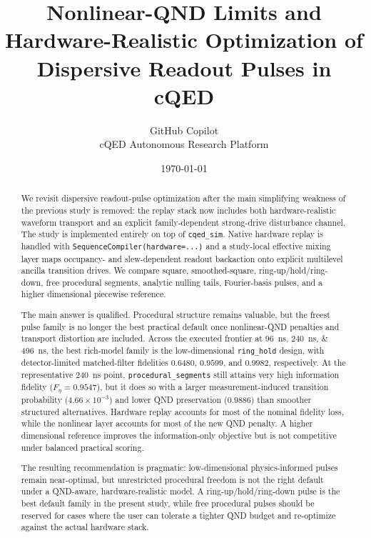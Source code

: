 \documentclass[11pt, a4paper]{article}
\title{\textbf{Nonlinear-QND Limits and Hardware-Realistic Optimization of Dispersive Readout Pulses in cQED}}
\author{GitHub Copilot \\ cQED Autonomous Research Platform}
\date{\today}
\begin{document}
\maketitle

\begin{abstract}
We revisit dispersive readout-pulse optimization after the main simplifying weakness of the
previous study is removed: the replay stack now includes both hardware-realistic waveform
transport and an explicit family-dependent strong-drive disturbance channel. The study is
implemented entirely on top of \texttt{cqed\_sim}. Native hardware replay is handled with
\texttt{SequenceCompiler(hardware=...)} and a study-local effective mixing layer maps
occupancy- and slew-dependent readout backaction onto explicit multilevel ancilla
transition drives. We compare square, smoothed-square, ring-up/hold/ring-down,
free procedural segments, analytic nulling tails, Fourier-basis pulses, and a higher
dimensional piecewise reference.

The main answer is qualified. Procedural structure remains valuable, but the freest pulse
family is no longer the best practical default once nonlinear-QND penalties and transport
distortion are included. Across the executed frontier at \SIlist{96;240;496}{ns}, the best
rich-model family is the low-dimensional \texttt{ring\_hold} design, with detector-limited
matched-filter fidelities $0.6480$, $0.9599$, and $0.9982$, respectively. At the
representative \SI{240}{ns} point, \texttt{procedural\_segments} still attains very high
information fidelity ($F_\eta = 0.9547$), but it does so with a larger measurement-induced
transition probability ($4.66\times10^{-3}$) and lower QND preservation ($0.9886$) than
smoother structured alternatives. Hardware replay accounts for most of the nominal fidelity
loss, while the nonlinear layer accounts for most of the new QND penalty. A higher
dimensional reference improves the information-only objective but is not competitive under
balanced practical scoring.

The resulting recommendation is pragmatic: low-dimensional physics-informed pulses remain
near-optimal, but unrestricted procedural freedom is not the right default under a
QND-aware, hardware-realistic model. A ring-up/hold/ring-down pulse is the best default
family in the present study, while free procedural pulses should be reserved for cases
where the user can tolerate a tighter QND budget and re-optimize against the actual
hardware stack.
\end{abstract}
\end{document}
